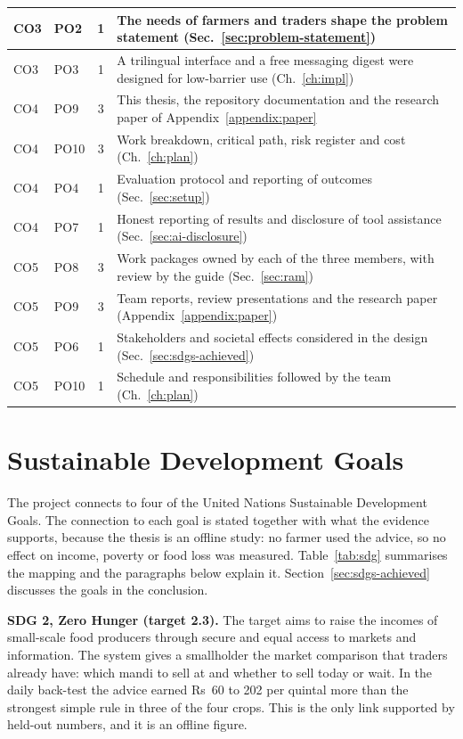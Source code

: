 {\begin{longtable}{|l|l|c|p{8.2cm}|}
CO3 & PO2 & 1 & The needs of farmers and traders shape the problem statement (Sec.~\ref{sec:problem-statement}) \\ \hline
CO3 & PO3 & 1 & A trilingual interface and a free messaging digest were designed for low-barrier use (Ch.~\ref{ch:impl}) \\ \hline
CO4 & PO9 & 3 & This thesis, the repository documentation and the research paper of Appendix~\ref{appendix:paper} \\ \hline
CO4 & PO10 & 3 & Work breakdown, critical path, risk register and cost (Ch.~\ref{ch:plan}) \\ \hline
CO4 & PO4 & 1 & Evaluation protocol and reporting of outcomes (Sec.~\ref{sec:setup}) \\ \hline
CO4 & PO7 & 1 & Honest reporting of results and disclosure of tool assistance (Sec.~\ref{sec:ai-disclosure}) \\ \hline
CO5 & PO8 & 3 & Work packages owned by each of the three members, with review by the guide (Sec.~\ref{sec:ram}) \\ \hline
CO5 & PO9 & 3 & Team reports, review presentations and the research paper (Appendix~\ref{appendix:paper}) \\ \hline
CO5 & PO6 & 1 & Stakeholders and societal effects considered in the design (Sec.~\ref{sec:sdgs-achieved}) \\ \hline
CO5 & PO10 & 1 & Schedule and responsibilities followed by the team (Ch.~\ref{ch:plan}) \\ \hline
\end{longtable}
}

\section{Sustainable Development Goals}

\noindent The project connects to four of the United Nations Sustainable Development Goals. The connection to each goal is stated together with what the evidence supports, because the thesis is an offline study: no farmer used the advice, so no effect on income, poverty or food loss was measured. Table~\ref{tab:sdg} summarises the mapping and the paragraphs below explain it. Section~\ref{sec:sdgs-achieved} discusses the goals in the conclusion.

\noindent\textbf{SDG 2, Zero Hunger (target 2.3).} The target aims to raise the incomes of small-scale food producers through secure and equal access to markets and information. The system gives a smallholder the market comparison that traders already have: which mandi to sell at and whether to sell today or wait. In the daily back-test the advice earned Rs~60 to 202 per quintal more than the strongest simple rule in three of the four crops. This is the only link supported by held-out numbers, and it is an offline figure.

